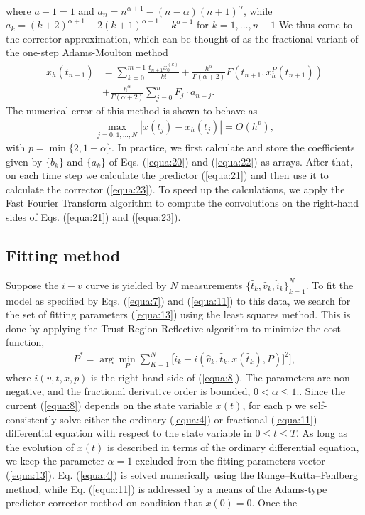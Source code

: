 \documentclass[10pt]{article}
\begin{document}
\begin{multicols}{2}
\begin{align}
        \end{align}
        where $a-1 = 1$ and $a_n = n^{\alpha + 1}-(n-\alpha)(n+1)^\alpha$, while $a_k = (k+2)^{\alpha + 1} - 2(k+1)^{\alpha + 1} + k^{\alpha + 1}$ for $k = 1, \dots, n-1$ We thus come to the corrector approximation, which can be thought of as the fractional variant of the one-step Adams-Moulton method
        \begin{align}
            x_h(t_{n+1}) & = \sum_{k=0}^{m-1} \frac{t_{n+1}x_0^{(k)}}{k!} + \frac{h^\alpha}{\Gamma (\alpha + 2)}  F(t_{n+1}, x_h^P (t_{n+1})) \nonumber \\ &+ \frac{h^\alpha}{\Gamma (\alpha + 2)} \sum_{j=0}^n F_j \cdot a_{n-j}. \label{equa:23}
        \end{align}
        The numerical error of this method is shown to behave as
        \begin{align}
            \max_{j=0,1,\dots,N} |x(t_j)-x_h(t_j)|=O(h^p), \label{equa:24}
        \end{align}
        with $p=\min\{2,1+\alpha\}$. In practice, we first calculate and store the coefficients given by $\{b_k\}$ and $\{a_k\}$ of Eqs. (\ref{equa:20}) and (\ref{equa:22}) as arrays. After that, on each time step we calculate the predictor (\ref{equa:21}) and then use it to calculate the corrector (\ref{equa:23}). To speed up the calculations, we apply the Fast Fourier Transform algorithm to compute the convolutions on the right-hand sides of Eqs. (\ref{equa:21}) and (\ref{equa:23}).
        \par
        {\centering \subsection{ \bfseries Fitting method}}
        Suppose the $i-v$ curve is yielded by $N$ measurements $\{\hat{t}_k, \hat{v}_k, \hat{i}_k\}_{k=1}^N$. To fit the model as specified by Eqs. (\ref{equa:7}) and (\ref{equa:11}) to this data, we search for the set of fitting parameters (\ref{equa:13}) using the least squares method. This is done by applying the Trust Region Reflective algorithm to minimize the cost function,
        \\
        \begin{align}
            P^* = \arg \min_P \sum_{K=1}^N \biggl[\hat{i}_k-i(\hat{v}_k,\hat{t}_k, x(\hat{t}_k),P)]^2 \biggr], \label{equa:25}
        \end{align}
        where $i(v, t, x, p)$ is the right-hand side of (\ref{equa:8}). The parameters are non-negative, and the fractional derivative order is bounded, $0 < \alpha \le 1.$. Since the current (\ref{equa:8}) depends on the state variable $x(t)$, for each p we self-consistently solve either the ordinary (\ref{equa:4}) or fractional (\ref{equa:11}) differential equation with respect to the state variable in $0 \le t \le T$. As long as the evolution of $x(t)$ is described in terms of the ordinary differential equation, we keep the parameter $\alpha = 1$ excluded from the fitting parameters vector (\ref{equa:13}). Eq. (\ref{equa:4}) is solved numerically using the Runge–Kutta–Fehlberg method, while Eq. (\ref{equa:11}) is addressed by a means of the Adams-type predictor corrector method on condition that $x(0) = 0$. Once the

\end{multicols}
\end{document}

